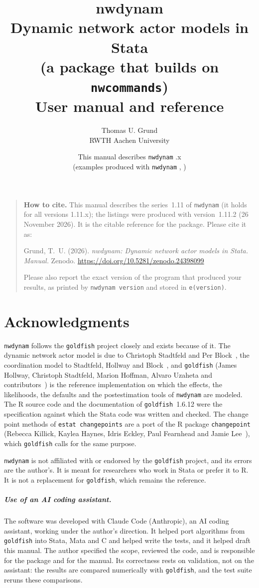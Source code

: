 \documentclass[11pt,a4paper]{report}
\title{\textbf{nwdynam}\\[4pt]\large Dynamic network actor models in Stata\\ (a package that builds on \texttt{nwcommands})\\[6pt]\normalsize User manual and reference}
\author{Thomas U. Grund\\ RWTH Aachen University}
\date{This manual describes \texttt{nwdynam} \manualseries.x\\ (examples produced with \texttt{nwdynam} \pkgversion, \pkgdate)}
\newcommand{\nwdynam}{\texttt{nwdynam}}
\newcommand{\goldfish}{\texttt{goldfish}}
\newcommand{\gfver}{1.6.12}
\newcommand{\manualseries}{1.11}
\newcommand{\pkgversion}{1.11.2}
\newcommand{\pkgdate}{26 November 2026}
\newcommand{\manualdoi}{10.5281/zenodo.24398099}
\newcommand{\citedoi}{ Zenodo. \url{https://doi.org/\manualdoi}}
\begin{document}
\maketitle
\begin{quote}\noindent\textbf{How to cite.} This manual describes the series~\manualseries{} of \nwdynam{} (it holds for all versions \manualseries.x); the listings were produced with version~\pkgversion{} (\pkgdate). It is the citable reference for the package. Please cite it as:\par\smallskip
\noindent Grund, T.~U. (2026). \emph{nwdynam: Dynamic network actor models in Stata. Manual.}\citedoi\par\smallskip
\noindent Please also report the exact version of the program that produced your results, as printed by \texttt{nwdynam version} and stored in \texttt{e(version)}.
\end{quote}
\chapter*{Acknowledgments}
\nwdynam{} follows the \goldfish{} project closely and exists because of it. The dynamic network actor model is due to Christoph Stadtfeld and Per Block~\cite{stadtfeld2017b}, the coordination model to Stadtfeld, Hollway and Block~\cite{stadtfeld2017h}, and \goldfish{} (James Hollway, Christoph Stadtfeld, Marion Hoffman, Alvaro Uzaheta and contributors~\cite{goldfish}) is the reference implementation on which the effects, the likelihoods, the defaults and the postestimation tools of \nwdynam{} are modeled. The R source code and the documentation of \goldfish{}~\gfver{} were the specification against which the Stata code was written and checked. The change point methods of \texttt{estat changepoints} are a port of the R package \texttt{changepoint} (Rebecca Killick, Kaylea Haynes, Idris Eckley, Paul Fearnhead and Jamie Lee~\cite{killick2014}), which \goldfish{} calls for the same purpose.

\nwdynam{} is not affiliated with or endorsed by the \goldfish{} project, and its errors are the author's. It is meant for researchers who work in Stata or prefer it to R. It is not a replacement for \goldfish{}, which remains the reference.

\paragraph{Use of an AI coding assistant.} The software was developed with Claude Code (Anthropic), an AI coding assistant, working under the author's direction. It helped port algorithms from \goldfish{} into Stata, Mata and C and helped write the tests, and it helped draft this manual. The author specified the scope, reviewed the code, and is responsible for the package and for the manual. Its correctness rests on validation, not on the assistant: the results are compared numerically with \goldfish{}, and the test suite reruns these comparisons.
\end{document}
